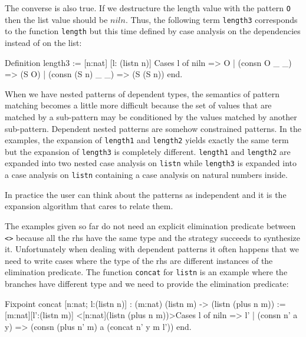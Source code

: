 The converse is also true. If
we destructure the  length  value with the pattern \texttt{O} then the list
value should be $niln$. 
Thus, the following term \texttt{length3} corresponds to the function
\texttt{length} but this time defined by case analysis on the dependencies instead of on the list:

\begin{coq_example}
Definition length3 := [n:nat] [l: (listn n)]
                         Cases l of 
                            niln              => O
                         |  (consn O _ _)     => (S O)
                         |  (consn (S n) _ _) => (S (S n))
                         end.
\end{coq_example}

When we have nested patterns of dependent types, the semantics of
pattern matching becomes a little more difficult because
the set of values that are matched by a sub-pattern may be conditioned by the
values matched by another sub-pattern. Dependent nested patterns are
somehow constrained patterns. 
In the examples, the expansion of
\texttt{length1} and \texttt{length2} yields exactly the same term
 but the
expansion of \texttt{length3} is completely different. \texttt{length1} and
\texttt{length2} are expanded into two nested case analysis on
\texttt{listn} while \texttt{length3} is expanded into a case analysis on
\texttt{listn} containing a case analysis on natural numbers inside.


In practice the user can think about the patterns as independent and
it is the expansion algorithm that cares to relate them. \\
\fi
%
%
%

The examples  given so far do not need an explicit elimination predicate
between \texttt{<>} because all the rhs have the same type and the
strategy succeeds to synthesize it.
Unfortunately when dealing with dependent patterns it often happens
that we need to write cases where the type of the rhs are 
different  instances of the elimination  predicate.
The function  \texttt{concat} for \texttt{listn}
is an example where the branches have different type
and we need to provide the elimination predicate:

\begin{coq_example}
Fixpoint concat [n:nat; l:(listn n)]
 :  (m:nat) (listn m) -> (listn (plus n m))
 := [m:nat][l':(listn m)] 
      <[n:nat](listn (plus n m))>Cases l  of 
         niln          => l'
      | (consn n' a y) => (consn (plus n' m) a (concat n' y m l'))
      end.
\end{coq_example}

